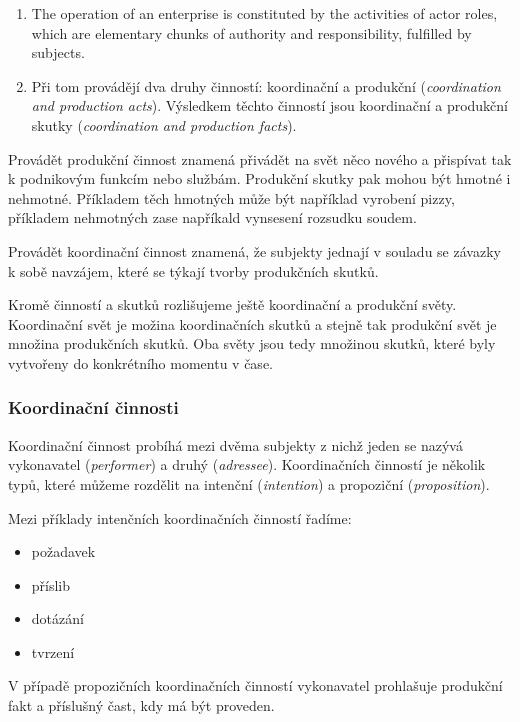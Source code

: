 \documentclass[]{article}
\begin{document}
\begin{enumerate}
\item The operation of an enterprise is constituted by the activities of actor roles, which are elementary chunks of authority and responsibility, fulfilled by subjects. %
\item Při tom provádějí dva druhy činností: koordinační a produkční (\textit{coordination and production acts}). Výsledkem těchto činností jsou koordinační a produkční skutky (\textit{coordination and production facts}).
\end{enumerate}

Provádět produkční činnost znamená přivádět na svět něco nového a přispívat tak k podnikovým funkcím nebo službám. Produkční skutky pak mohou být hmotné i nehmotné. Příkladem těch hmotných může být například vyrobení pizzy, příkladem nehmotných zase napříkald vynsesení rozsudku soudem.

Provádět koordinační činnost znamená, že subjekty jednají v souladu se závazky k sobě navzájem, které se týkají tvorby produkčních skutků.

Kromě činností a skutků rozlišujeme ještě koordinační a produkční světy. Koordinační svět je možina koordinačních skutků a stejně tak produkční svět je množina produkčních skutků. Oba světy jsou tedy množinou skutků, které byly vytvořeny do konkrétního momentu v čase.


\subsubsection{Koordinační činnosti}
Koordinační činnost probíhá mezi dvěma subjekty z nichž jeden se nazývá vykonavatel (\textit{performer}) a druhý (\textit{adressee}). Koordinačních činností je několik typů, které můžeme rozdělit na intenční (\textit{intention}) a propoziční (\textit{proposition}).

Mezi příklady intenčních koordinačních činností řadíme:

\begin{itemize}
\item požadavek
\item příslib
\item dotázání
\item tvrzení
\end{itemize}

V případě propozičních koordinačních činností vykonavatel prohlašuje produkční fakt a příslušný čast, kdy má být proveden. %
\end{document}

